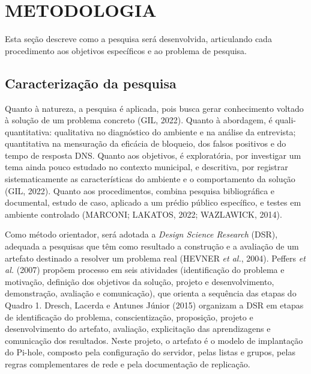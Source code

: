 \documentclass[12pt,a4paper]{article}
\begin{document}
\clearpage
\section{METODOLOGIA}
Esta seção descreve como a pesquisa será desenvolvida, articulando cada procedimento aos objetivos específicos e ao problema de pesquisa.

\subsection{Caracterização da pesquisa}
Quanto à natureza, a pesquisa é aplicada, pois busca gerar conhecimento voltado à solução de um problema concreto (GIL, 2022). Quanto à abordagem, é quali-quantitativa: qualitativa no diagnóstico do ambiente e na análise da entrevista; quantitativa na mensuração da eficácia de bloqueio, dos falsos positivos e do tempo de resposta DNS. Quanto aos objetivos, é exploratória, por investigar um tema ainda pouco estudado no contexto municipal, e descritiva, por registrar sistematicamente as características do ambiente e o comportamento da solução (GIL, 2022). Quanto aos procedimentos, combina pesquisa bibliográfica e documental, estudo de caso, aplicado a um prédio público específico, e testes em ambiente controlado (MARCONI; LAKATOS, 2022; WAZLAWICK, 2014).

Como método orientador, será adotada a \textit{Design Science Research} (DSR), adequada a pesquisas que têm como resultado a construção e a avaliação de um artefato destinado a resolver um problema real (HEVNER \textit{et al.}, 2004). Peffers \textit{et al.} (2007) propõem processo em seis atividades (identificação do problema e motivação, definição dos objetivos da solução, projeto e desenvolvimento, demonstração, avaliação e comunicação), que orienta a sequência das etapas do Quadro 1. Dresch, Lacerda e Antunes Júnior (2015) organizam a DSR em etapas de identificação do problema, conscientização, proposição, projeto e desenvolvimento do artefato, avaliação, explicitação das aprendizagens e comunicação dos resultados. Neste projeto, o artefato é o modelo de implantação do Pi-hole, composto pela configuração do servidor, pelas listas e grupos, pelas regras complementares de rede e pela documentação de replicação.
\end{document}
